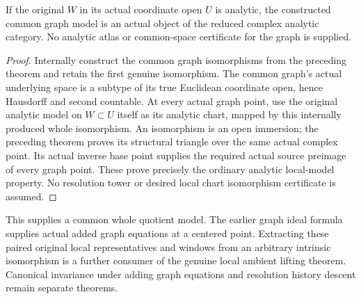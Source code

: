 \begin{theorem}
\label{hir:actual-local-common-graph-analytic-object}
\leanok
If the original $W$ in its actual coordinate open $U$ is analytic, the
constructed common graph model is an actual object of the reduced complex
analytic category. No analytic atlas or common-space certificate for the
graph is supplied.
\end{theorem}
\begin{proof}
Internally construct the common graph isomorphisms from the preceding
theorem and retain the first genuine isomorphism. The common graph's actual
underlying space is a subtype of its true Euclidean coordinate open, hence
Hausdorff and second countable. At every actual graph point, use the original
analytic model on $W\subset U$ itself as its analytic chart, mapped by this
internally produced whole isomorphism. An isomorphism is an open immersion;
the preceding theorem proves its structural triangle over the same actual
complex point. Its actual inverse base point supplies the required actual
source preimage of every graph point. These prove precisely the ordinary
analytic local-model property. No resolution tower or desired local chart
isomorphism certificate is assumed.
\end{proof}

This supplies a common whole quotient model. The earlier graph ideal
formula supplies actual added graph equations at a centered point.
Extracting these paired original local representatives and windows from
an arbitrary intrinsic isomorphism is a further consumer of the genuine
local ambient lifting theorem. Canonical invariance under adding graph
equations and resolution history descent remain separate theorems.
